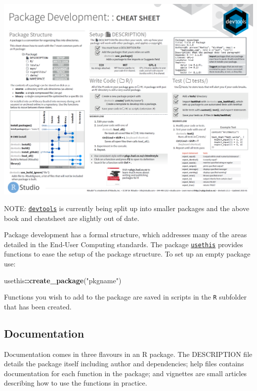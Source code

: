 \documentclass[]{book}
\newenvironment{Shaded}{\begin{snugshade}}{\end{snugshade}}
\newcommand{\KeywordTok}[1]{\textcolor[rgb]{0.13,0.29,0.53}{\textbf{#1}}}
\newcommand{\NormalTok}[1]{#1}
\newcommand{\OperatorTok}[1]{\textcolor[rgb]{0.81,0.36,0.00}{\textbf{#1}}}
\newcommand{\StringTok}[1]{\textcolor[rgb]{0.31,0.60,0.02}{#1}}
\begin{document}
\href{https://rawgit.com/rstudio/cheatsheets/master/package-development.pdf}{\includegraphics{images/package-development.png}}

NOTE: \href{http://devtools.r-lib.org/}{\texttt{devtools}} is currently being split up into smaller packages
and the above book and cheatsheet are slightly out of date.

Package development has a formal structure, which addresses many of the areas detailed in the
End-User Computing standards. The package \href{https://usethis.r-lib.org}{\texttt{usethis}} provides
functions to ease the setup of the package structure. To set up an empty package use:

\begin{Shaded}
\begin{Highlighting}[]
\NormalTok{usethis}\OperatorTok{::}\KeywordTok{create_package}\NormalTok{(}\StringTok{"pkgname"}\NormalTok{)}
\end{Highlighting}
\end{Shaded}

Functions you wish to add to the package are saved in scripts in the \texttt{R} subfolder that has been
created.

\hypertarget{documentation-2}{%
\subsection{Documentation}\label{documentation-2}}

Documentation comes in three flavours in an R package. The DESCRIPTION file details the package
itself including author and dependencies; help files contains documentation for each function in
the package; and vignettes are small articles describing how to use the functions in practice.
\end{document}
